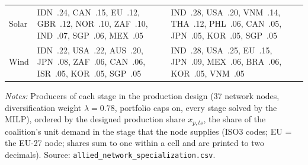 \begin{table}[htbp]
\begin{threeparttable}
\begin{tabularx}{\textwidth}{@{}>{\raggedright\arraybackslash}p{2.1cm} >{\raggedright\arraybackslash}X >{\raggedright\arraybackslash}X@{}}
Solar & IDN~.24, CAN~.15, EU~.12, GBR~.12, NOR~.10, ZAF~.10, IND~.07, SGP~.06, MEX~.05 & IND~.28, USA~.20, VNM~.14, THA~.12, PHL~.06, CAN~.05, JPN~.05, KOR~.05, SGP~.05 \\
Wind & IDN~.22, USA~.22, AUS~.20, JPN~.08, ZAF~.06, CAN~.06, ISR~.05, KOR~.05, SGP~.05 & IND~.28, USA~.25, EU~.15, JPN~.09, MEX~.06, BRA~.06, KOR~.05, VNM~.05 \\
\bottomrule
\end{tabularx}
\begin{tablenotes}[flushleft]\footnotesize
\item \emph{Notes:} Producers of each stage in the production design (37 network nodes, diversification weight $\lambda=0.78$, portfolio caps on, every stage solved by the MILP), ordered by the designed production share $x_{p,ts}$, the share of the coalition's unit demand in the stage that the node supplies (ISO3 codes; EU = the EU-27 node; shares sum to one within a cell and are printed to two decimals). Source: \texttt{allied\_network\_specialization.csv}.
\end{tablenotes}
\end{threeparttable}
\end{table}
